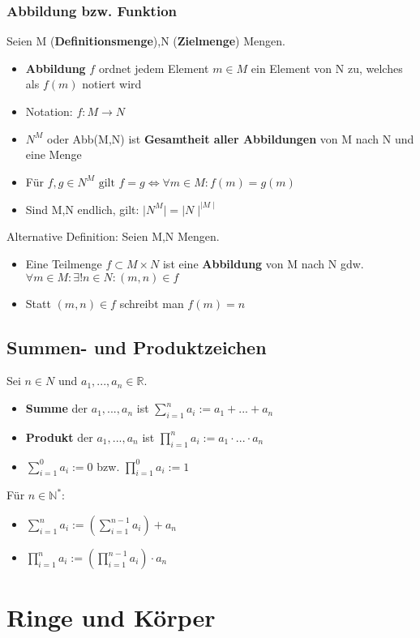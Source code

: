 \documentclass[titlepage]{article}
\newcommand{\N}{\mathbb{N}}
\newcommand{\R}{\mathbb{R}}
\newcommand{\1}{\mathbb{1}}
\newcommand{\0}{\mathbb{0}}
\begin{document}
				\subsubsection{Abbildung bzw. Funktion}
					Seien M (\textbf{Definitionsmenge}),N (\textbf{Zielmenge}) Mengen.
					\begin{itemize}
						\item \textbf{Abbildung} $f$ ordnet jedem Element $m\in M$ ein Element von N zu, welches als $f(m)$ notiert wird
						\item Notation: $f:M\rightarrow N$
						\item $N^M$ oder Abb(M,N) ist \textbf{Gesamtheit aller Abbildungen} von M nach N und eine Menge
						\item Für $f,g\in N^M\text{ gilt }f=g\Longleftrightarrow\forall m\in M:f(m)=g(m)$
						\item Sind M,N endlich, gilt: $\mid N^M\mid=\mid N\mid^{\mid M\mid}$
					\end{itemize}
					Alternative Definition: Seien M,N Mengen.
					\begin{itemize}
						\item Eine Teilmenge $f\subset M\times N$ ist eine \textbf{Abbildung} von M nach N gdw. $\forall m\in M: \exists!n\in N:(m,n)\in f$
						\item Statt $(m,n)\in f$ schreibt man $f(m)=n$
					\end{itemize}
			\subsection{Summen- und Produktzeichen}
				Sei $n\in N$ und $a_1,...,a_n\in\R$.
				\begin{itemize}
					\item \textbf{Summe} der $a_1,...,a_n$ ist $\sum\limits^n_{i=1}a_i:=a_1+...+a_n$
					\item \textbf{Produkt} der $a_1,...,a_n$ ist $\prod\limits^n_{i=1}a_i:=a_1\cdot...\cdot a_n$
					\item $\sum\limits^0_{i=1}a_i:=0$ bzw. $\prod\limits^0_{i=1}a_i:=1$
				\end{itemize}
				Für $n\in\N^*$:
				\begin{itemize}
					\item $\sum\limits^n_{i=1}a_i:=\left(\sum\limits^{n-1}_{i=1}a_i\right)+a_n$
					\item $\prod\limits^n_{i=1}a_i:=\left(\prod\limits^{n-1}_{i=1}a_i\right)\cdot a_n$
				\end{itemize}
		\section{Ringe und Körper}
\end{document}
